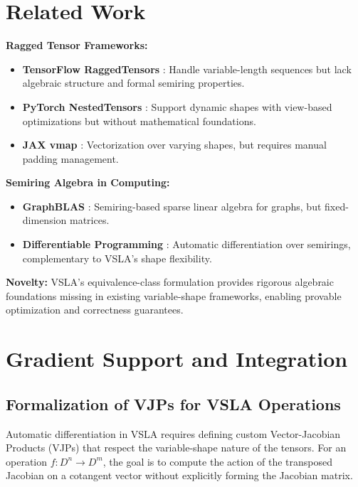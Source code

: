 \documentclass[11pt]{article}
\begin{document}
\section{Related Work}  
\label{sec:related}

\textbf{Ragged Tensor Frameworks:}
\begin{itemize}[leftmargin=1.5em]
\item \textbf{TensorFlow RaggedTensors} \cite{TF2024}: Handle variable-length sequences but lack algebraic structure and formal semiring properties.
\item \textbf{PyTorch NestedTensors} \cite{PyTorch2023}: Support dynamic shapes with view-based optimizations but without mathematical foundations.
\item \textbf{JAX vmap} \cite{JAX2020}: Vectorization over varying shapes, but requires manual padding management.
\end{itemize}

\textbf{Semiring Algebra in Computing:}
\begin{itemize}[leftmargin=1.5em]  
\item \textbf{GraphBLAS} \cite{GraphBLAS2019}: Semiring-based sparse linear algebra for graphs, but fixed-dimension matrices.
\item \textbf{Differentiable Programming} \cite{Innes2019}: Automatic differentiation over semirings, complementary to VSLA's shape flexibility.
\end{itemize}

\textbf{Novelty:} VSLA's equivalence-class formulation provides rigorous algebraic foundations missing in existing variable-shape frameworks, enabling provable optimization and correctness guarantees.

\section{Gradient Support and Integration}  
\label{sec:gradients}

\subsection{Formalization of VJPs for VSLA Operations}
Automatic differentiation in VSLA requires defining custom Vector-Jacobian Products (VJPs) that respect the variable-shape nature of the tensors. For an operation \(f: D^n \to D^m\), the goal is to compute the action of the transposed Jacobian on a cotangent vector without explicitly forming the Jacobian matrix.
\end{document}
